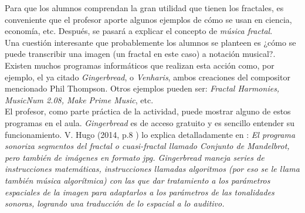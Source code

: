 \documentclass[a4paper, openright, 11pt, titlepage]{report}
\theoremstyle{definition}\newtheorem{defin}[propo]{Definition}
\theoremstyle{definition}\newtheorem{obser}[propo]{Remark}
\theoremstyle{definition}\newtheorem{ejem}[propo]{Ejemplo}
\theoremstyle{definition}\newtheorem{algoritmo}[propo]{Algoritmo}
\begin{document}
Para que los alumnos comprendan la gran utilidad que tienen los fractales, es conveniente que el profesor aporte algunos ejemplos de cómo se usan en ciencia, economía, etc. Después, se pasará a explicar el concepto de \textit{música fractal}. \\
Una cuestión interesante que probablemente los alumnos se planteen es ¿cómo se puede transcribir una imagen (un fractal en este caso) a notación musical?. Existen muchos programas informáticos que realizan esta acción como, por ejemplo, el ya citado \textit{Gingerbread}, o \textit{Venharis}, ambos creaciones del compositor mencionado Phil Thompson. Otros ejemplos pueden ser: \textit{Fractal Harmonies, MusicNum 2.08, Make Prime Music}, etc.\\
El profesor, como parte práctica de la actividad, puede mostrar alguno de estos programas en el aula. \textit{Gingerbread} es de acceso gratuito y es sencillo entender su funcionamiento. V. Hugo (2014, p.8 ) lo explica detalladamente en \cite{gingerbread}: \textit{El programa sonoriza segmentos del fractal o cuasi-fractal llamado Conjunto de Mandelbrot, pero también de imágenes en formato jpg. Gingerbread maneja series de instrucciones matemáticas, instrucciones llamadas algoritmos (por eso se le llama también música algorítmica) con las que dar tratamiento a los parámetros espaciales de la imagen para adaptarlos a los parámetros de las tonalidades sonoras, logrando una traducción de lo espacial a lo auditivo.}
\end{document}
